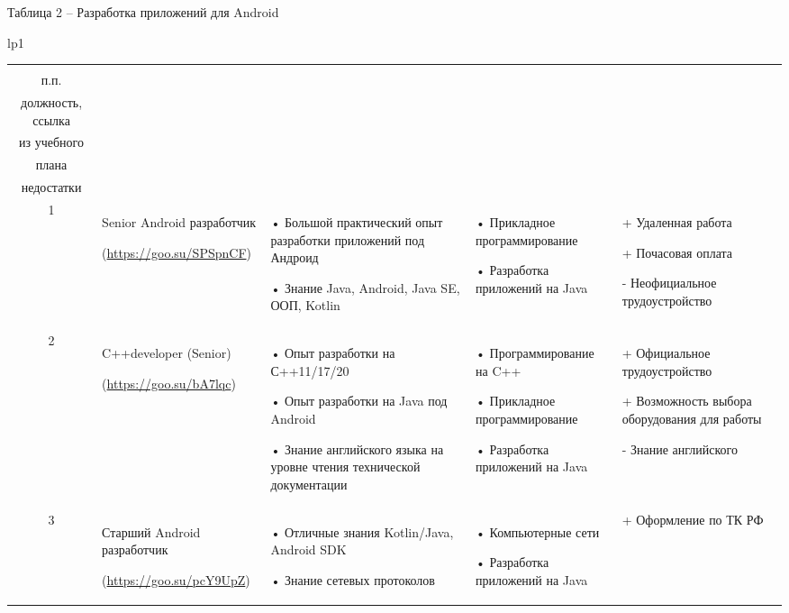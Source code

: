 \documentclass[14pt]{extreport}
\begin{document}
\begin{landscape}
\newpage
Таблица 2 – Разработка приложений для Android
\begin{longtable}[H]{lp{1\linewidth}}

\caption{Разработка приложений для  \label{table2}}


\centering

\begin{small}


    \begin{tabular}{|c|p{}|p{6cm}|p{5cm}|p{5cm}|}
	\hline 
	\makecell{№ \\ п.п.} &	\makecell{Наименование,\\ должность, ссылка} &	\makecell{Требования} & 	\makecell{Дисциплины \\ из учебного \\плана} &	\makecell{Преимущества и \\недостатки}  \\ 
	\hline 
	1	& Senior Android разработчик
	
(\url{https://goo.su/SPSpnCF}) &
•	Большой практический опыт разработки приложений под Андроид

•	Знание Java, Android, Java SE, ООП, Kotlin &
•	Прикладное программирование

•	Разработка приложений на Java &
+	Удаленная работа


+	Почасовая оплата

-	Неофициальное трудоустройство \\

	\hline
	2	& C++developer (Senior)
	
(\url{https://goo.su/bA7lqc}) &
•	Опыт разработки на С++11/17/20

•	Опыт разработки на Java под Android 

•	Знание английского языка на уровне чтения технической документации &
•	Программирование на C++

•	Прикладное программирование

•	Разработка приложений на Java &
+	Официальное трудоустройство 

+	Возможность выбора оборудования для работы

-	Знание английского\\
	\hline 
	3	& Старший Android разработчик 
	
(\url{https://goo.su/pcY9UpZ}) &
•	Отличные знания Kotlin/Java, Android SDK

•	Знание сетевых протоколов &
•	Компьютерные сети

•	Разработка приложений на Java &
+	Оформление по ТК РФ


\end{tabular}
\end{small}
\end{longtable}
\end{landscape}
\end{document}
